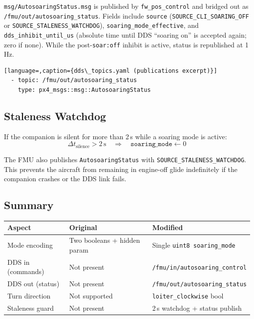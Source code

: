 \documentclass[12pt,a4paper]{report}
\begin{document}
\texttt{msg/AutosoaringStatus.msg} is published by \texttt{fw\_pos\_control} and
bridged out as \texttt{/fmu/out/autosoaring\_status}. Fields include
\texttt{source} (\texttt{SOURCE\_CLI\_SOARING\_OFF} or
\texttt{SOURCE\_STALENESS\_WATCHDOG}), \texttt{soaring\_mode\_effective}, and
\texttt{dds\_inhibit\_until\_us} (absolute time until DDS ``soaring on'' is
accepted again; zero if none). While the post-\texttt{soar:off} inhibit is
active, status is republished at 1\,Hz.

\begin{lstlisting}[language=,caption={dds\_topics.yaml (publications excerpt)}]
  - topic: /fmu/out/autosoaring_status
    type: px4_msgs::msg::AutosoaringStatus
\end{lstlisting}

\subsection{Staleness Watchdog}

If the companion is silent for more than 2\,s while a soaring mode is
active:
\begin{equation}
  \Delta t_{\text{silence}} > 2\,\text{s}
  \quad\Rightarrow\quad
  \texttt{soaring\_mode} \leftarrow 0
\end{equation}

The FMU also publishes \texttt{AutosoaringStatus} with
\texttt{SOURCE\_STALENESS\_WATCHDOG}. This prevents the aircraft from remaining
in engine-off glide indefinitely if the companion crashes or the DDS link fails.

\subsection{Summary}

\begin{center}
\begin{tabular}{p{3.5cm}p{4.5cm}p{4.5cm}}
\toprule
Aspect & Original & Modified \\
\midrule
Mode encoding & Two booleans + hidden param & Single \texttt{uint8 soaring\_mode} \\
DDS in (commands) & Not present & \texttt{/fmu/in/autosoaring\_control} \\
DDS out (status) & Not present & \texttt{/fmu/out/autosoaring\_status} \\
Turn direction & Not supported & \texttt{loiter\_clockwise} bool \\
Staleness guard & Not present & 2\,s watchdog + status publish \\
\bottomrule
\end{tabular}
\end{center}
\end{document}
